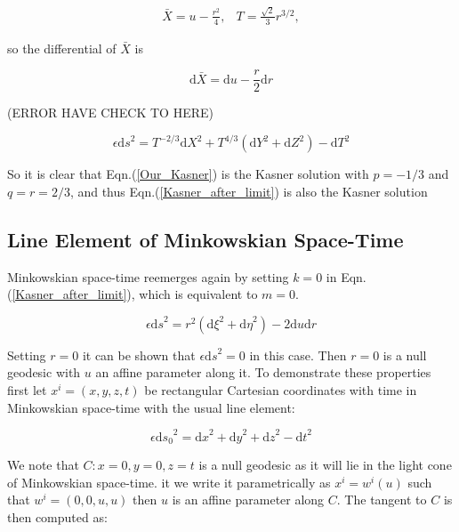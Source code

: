 \begin{align*}
\bar{X} = u - \frac{r^2}{4}, & T = \frac{\sqrt{2}}{3} r^{3/2},
\end{align*}

\noindent so the differential of $\bar{X}$ is

\begin{equation*}
\mathrm{d} \bar{X} = \mathrm{d} u - \frac{r}{2} \mathrm{d}r
\end{equation*}

(ERROR HAVE CHECK TO HERE)

\begin{equation}\label{Our_Kasner} 
\epsilon {\mathrm{d}s}^2 = T^{-2/3} {\mathrm{d}X}^2 + T^{4/3} \left( \mathrm{d}Y^2 + \mathrm{d}Z^2 \right) - \mathrm{d}T^2
\end{equation}

\noindent So it is clear that Eqn.(\ref{Our_Kasner}) is the Kasner solution with $p = -1/3$ and $q = r = 2/3$, and thus Eqn.(\ref{Kasner_after_limit}) is also the Kasner solution

\subsection{Line Element of Minkowskian Space-Time}

Minkowskian space-time reemerges again by setting $k = 0$ in Eqn.(\ref{Kasner_after_limit}), which is equivalent to $m = 0$. 

\begin{equation}\label{Kasner_after_limit_no_k}
\epsilon {\mathrm{d}s}^2 = r^2 ({\mathrm{d}\xi}^2 + {\mathrm{d}\eta}^2) - 2 {\mathrm{d}u}{\mathrm{d}r}
\end{equation}

Setting $r = 0$ it can be shown that $\epsilon {\mathrm{d}s}^2 = 0$ in this case. Then $r = 0$ is a null geodesic with $u$ an affine parameter along it. To demonstrate these properties first let $x^i = (x,y,z,t)$ be rectangular Cartesian coordinates with time in Minkowskian space-time with the usual line element:

\begin{equation*} 
\epsilon {\mathrm{d}s_0}^2 = {\mathrm{d}x}^2 + {\mathrm{d}y}^2 + {\mathrm{d}z}^2 - {\mathrm{d}t}^2
\end{equation*} 

\noindent We note that $C: x = 0, y = 0, z = t$ is a null geodesic as it will lie in the light cone of Minkowskian space-time. it we write it parametrically as $x^i = w^i (u)$ such that $w^i = (0,0,u,u)$ then $u$ is an affine parameter along $C$. The tangent to $C$ is then computed as:


